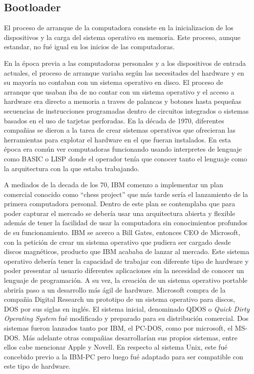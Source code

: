 \subsection{Bootloader}
El proceso de arranque de la computadora consiste en la inicializacion de los
dispositivos y la carga del sistema operativo en memoria. Este proceso, aunque
estandar, no fué igual en los inicios de las computadoras.

En la época previa a las computadoras personales y a los dispositivos de
entrada actuales, el proceso de arranque variaba según las necesitades del
hardware y en su mayoría no contaban con un sistema operativo en disco. El
proceso de arranque que usaban iba de no contar con un sistema operativo y el
acceso a hardware era directo a memoria a traves de palancas y botones hasta
pequeñas secuencias de instrucciones programadas dentro de circuitos integrados
o sistemas basados en el uso de tarjetas perforadas. En la década de 1970,
diferentes compañias se dieron a la tarea de crear sistemas operativos que
ofrecieran las herramientas para explotar el hardware en el que fueran
instalados. En esta época era común ver computadoras funcionando usando
interpretes de lenguaje como BASIC o LISP donde el operador tenía que conocer
tanto el lenguaje como la arquitectura con la que estaba trabajando.

A mediados de la decada de los 70, IBM comenzo a implementar un plan comercial
conocido como ``chess project'' que más tarde sería el lanzamiento de la primera
computadora personal. Dentro de este plan se contemplaba que para poder
capturar el mercado se debería usar una arquitectura abierta y flexible además
de tener la facilidad de usar la computadora sin conocimientos profundos de su
funcionamiento. IBM se acerco a Bill Gates, entonces CEO de Microsoft, con la
petición de crear un sistema operativo que pudiera ser cargado desde discos
magnéticos, producto que IBM acababa de lanzar al mercado. Este sistema
operativo debería tener la capacidad de trabajar con diferente tipo de hardware
y poder presentar al usuario diferentes aplicaciones sin la necesidad de
conocer un lenguaje de programación. A su vez, la creación de un sistema
operativo portable abriría paso a un desarrollo más ágil de hardware. Microsoft
compra de la compañia Digital Research un prototipo de un sistema operativo
para discos, DOS por sus siglas en inglés. El sistema inicial, denominado QDOS
o \emph{Quick Dirty Operating System} fué modificado y preparado para su
distribución comercial. Dos sistemas fueron lanzados tanto por IBM, el PC-DOS,
como por microsoft, el MS-DOS. Más adelante otras compañias desarrollarían sus
propios sistemas, entre ellos cabe mencionar Apple y Novell. En respecto al
sistema Unix, este fué concebido previo a la IBM-PC pero luego fué adaptado
para ser compatible con este tipo de hardware.

